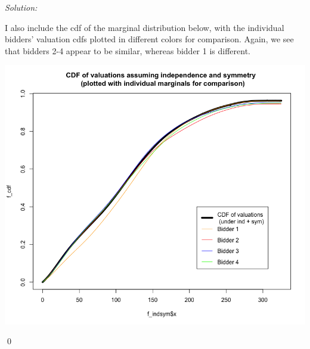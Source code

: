 \documentclass[12pt]{article}
\newenvironment{problem}[2][Problem]{\begin{trivlist}
\item[\hskip \labelsep {\bfseries #1}\hskip \labelsep {\bfseries #2.}]}{\end{trivlist}}
\newenvironment{sol}
    {\emph{Solution:}
    }
    {
    \qed
    }
\begin{document}
\begin{sol}
    I also include the cdf of the marginal distribution below, with the individual bidders' valuation cdfs plotted in different colors for comparison. Again, we see that bidders 2-4 appear to be similar, whereas bidder 1 is different.
    \begin{center}
        \includegraphics[scale=0.45]{CDF_val.png}
    \end{center}
\end{sol}
\begin{problem}{6}
\end{problem}
\end{document}
